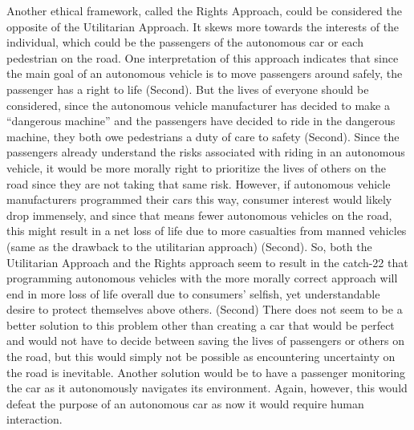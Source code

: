 \documentclass[10pt,twocolumn]{article}
\begin{document}
Another ethical framework, called the Rights Approach, could be considered the opposite of the Utilitarian Approach. It skews more towards the interests of the individual, which could be the passengers of the autonomous car or each pedestrian on the road. One interpretation of this approach indicates that since the main goal of an autonomous vehicle is to move passengers around safely, the passenger has a right to life (Second). But the lives of everyone should be considered, since the autonomous vehicle manufacturer has decided to make a “dangerous machine” and the passengers have decided to ride in the dangerous machine, they both owe pedestrians a duty of care to safety (Second). Since the passengers already understand the risks associated with riding in an autonomous vehicle, it would be more morally right to prioritize the lives of others on the road since they are not taking that same risk. However, if autonomous vehicle manufacturers programmed their cars this way, consumer interest would likely drop immensely, and since that means fewer autonomous vehicles on the road, this might result in a net loss of life due to more casualties from manned vehicles (same as the drawback to the utilitarian approach) (Second). So, both the Utilitarian Approach and the Rights approach seem to result in the catch-22 that programming autonomous vehicles with the more morally correct approach will end in more loss of life overall due to consumers’ selfish, yet understandable desire to protect themselves above others. (Second) There does not seem to be a better solution to this problem other than creating a car that would be perfect and would not have to decide between saving the lives of passengers or others on the road, but this would simply not be possible as encountering uncertainty on the road is inevitable. Another solution would be to have a passenger monitoring the car as it autonomously navigates its environment. Again, however, this would defeat the purpose of an autonomous car as now it would require human interaction.
\end{document}
